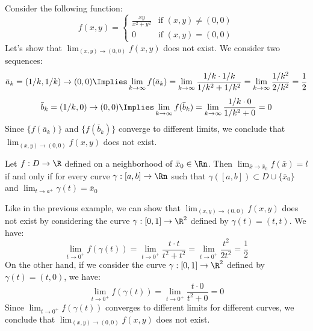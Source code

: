 \begin{eg}
    Consider the following function:
    \[
        f(x,y) = \begin{cases}
            \frac{xy}{x^2 + y^2} & \text{if } (x,y) \neq (0,0) \\
            0 & \text{if } (x,y) = (0,0)
        \end{cases}
    \]
    Let's show that $\lim_{(x,y) \to (0,0)} f(x,y)$ does not exist. We consider two sequences:
    \[
        \bar{a}_k = (1/k, 1/k) \to (0,0) \Implies \lim_{k \to \infty} f(\bar{a}_k) = \lim_{k \to \infty} \frac{1/k \cdot 1/k}{1/k^2 + 1/k^2} = \lim_{k \to \infty} \frac{1/k^2}{2/k^2} = \frac{1}{2}
    \]
    \[
        \bar{b}_k = (1/k, 0) \to (0,0) \Implies \lim_{k \to \infty} f(\bar{b}_k) = \lim_{k \to \infty} \frac{1/k \cdot 0}{1/k^2 + 0} = 0
    \]
    Since $\{f(\bar{a}_k)\}$ and $\{f(\bar{b}_k)\}$ converge to different limits, we conclude that $\lim_{(x,y) \to (0,0)} f(x,y)$ does not exist.
\end{eg}

\begin{theorem}
    Let $f: D \to \R$ defined on a neighborhood of $\bar{x}_0 \in \Rn$. Then $\lim_{\bar{x} \to \bar{x}_0} f(\bar{x}) = l$ if and only if for every curve $\gamma: [a,b] \to \Rn$ such that $\gamma([a,b]) \subset D \cup \{\bar{x}_0\}$ and $\lim_{t \to a^+}\gamma(t) = \bar{x}_0$
\end{theorem}

\begin{eg}
    Like in the previous example, we can show that $\lim_{(x,y) \to (0,0)} f(x,y)$ does not exist by considering the curve $\gamma: [0,1] \to \R^2$ defined by $\gamma(t) = (t,t)$. We have:
    \[
        \lim_{t \to 0^+} f(\gamma(t)) = \lim_{t \to 0^+} \frac{t \cdot t}{t^2 + t^2} = \lim_{t \to 0^+} \frac{t^2}{2t^2} = \frac{1}{2}
    \]
    On the other hand, if we consider the curve $\gamma: [0,1] \to \R^2$ defined by $\gamma(t) = (t,0)$, we have:
    \[
        \lim_{t \to 0^+} f(\gamma(t)) = \lim_{t \to 0^+} \frac{t \cdot 0}{t^2 + 0} = 0
    \]
    Since $\lim_{t \to 0^+} f(\gamma(t))$ converges to different limits for different curves, we conclude that $\lim_{(x,y) \to (0,0)} f(x,y)$ does not exist.
\end{eg}

